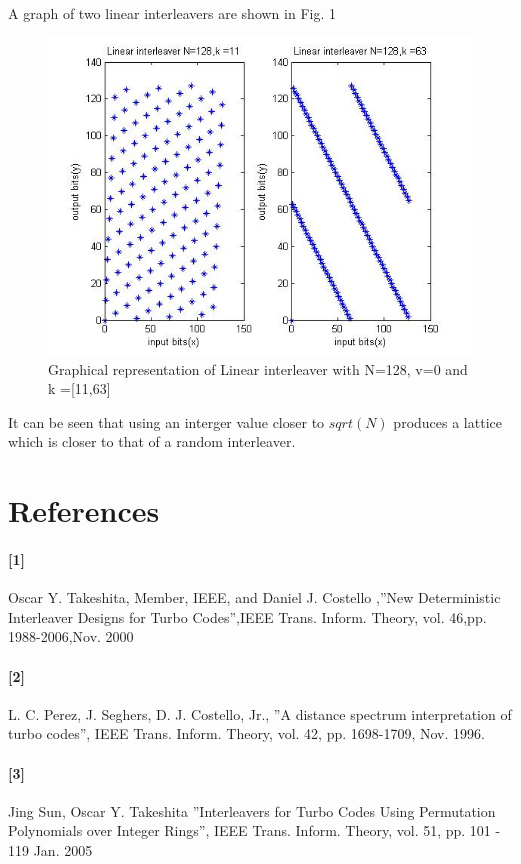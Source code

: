 \documentclass[20 pts]{article}
\begin{document}
A graph of two linear interleavers are shown in Fig. 1 

\begin{figure}[!]
\includegraphics[width=\textwidth,keepaspectratio]{zemi2fig3.jpg}
\caption{Graphical representation of Linear interleaver with N=128, v=0 and k =[11,63]}
\label{}
\end{figure}

It can be seen that using an interger value closer to $sqrt(N)$ produces a lattice which is closer to that of a random interleaver. 


\newpage
\section{References}
\paragraph{[1]}  Oscar Y. Takeshita, Member, IEEE, and Daniel J. Costello ,''New Deterministic Interleaver Designs for Turbo Codes'',IEEE Trans. Inform. Theory, vol.  46,pp. 1988-2006,Nov. 2000\\
\paragraph{[2]}  L. C. Perez, J. Seghers, D. J. Costello, Jr., ''A distance spectrum interpretation of turbo codes'', IEEE Trans. Inform. Theory, vol. 42, pp. 1698-1709, Nov. 1996.\\
\paragraph{[3]} Jing Sun, Oscar Y. Takeshita ”Interleavers for Turbo Codes Using Permutation Polynomials over Integer Rings”, IEEE Trans. Inform. Theory, vol. 51,
pp. 101 - 119 Jan. 2005
\end{document}
